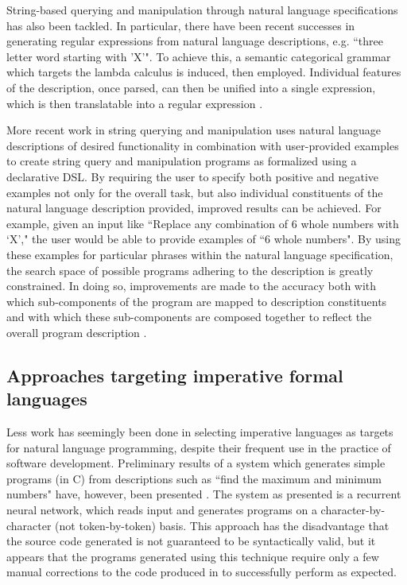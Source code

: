 \documentclass[a4paper,11pt]{proposal}
\begin{document}
String-based querying and manipulation through natural language specifications has also been tackled. In particular, there have been recent successes in generating regular expressions from natural language descriptions, e.g. ``three letter word starting with ’X’". To achieve this, a semantic categorical grammar which targets the lambda calculus is induced, then employed. Individual features of the description, once parsed, can then be unified into a single expression, which is then translatable into a regular expression \cite{kushman2013}.

More recent work in string querying and manipulation uses natural language descriptions of desired functionality in combination with user-provided examples to create string query and manipulation programs as formalized using a declarative DSL. By requiring the user to specify both positive and negative examples not only for the overall task, but also individual constituents of the natural language description provided, improved results can be achieved. For example, given an input like ``Replace any combination of 6 whole numbers with `X'," the user would be able to provide examples of ``6 whole numbers". By using these examples for particular phrases within the natural language specification, the search space of possible programs adhering to the description is greatly constrained. In doing so, improvements are made to the accuracy both with which sub-components of the program are mapped to description constituents and with which these sub-components are composed together to reflect the overall program description \cite{raza2015}.



\subsection{Approaches targeting imperative formal languages}

Less work has seemingly been done in selecting imperative languages as targets for natural language programming, despite their frequent use in the practice of software development. Preliminary results of a system which generates simple programs (in C) from descriptions such as ``find the maximum and minimum numbers" have, however, been presented \cite{mou2015}. The system as presented is a recurrent neural network, which reads input and generates programs on a character-by-character (not token-by-token) basis. This approach has the disadvantage that the source code generated is not guaranteed to be syntactically valid, but it appears that the programs generated using this technique require only a few manual corrections to the code produced in to successfully perform as expected.
\end{document}
